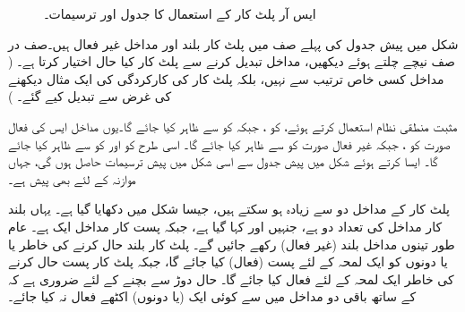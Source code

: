 \begin{figure}
\begin{subfigure}{0.45\textwidth}
\end{subfigure}
\caption{ایس آر پلٹ کار کے استعمال کا جدول اور ترسیمات۔}
\label{جدول_ترتیبی_ایس_آر_کام}
\end{figure}

شکل   میں پیش جدول     کی  پہلے صف میں پلٹ کار بلند    اور مداخل غیر فعال ہیں۔صف در صف نیچے چلتے ہوئے دیکھیں، مداخل تبدیل کرنے سے پلٹ کار کیا حال اختیار   کرتا ہے۔ ( مداخل کسی خاص ترتیب سے نہیں،   بلکہ پلٹ کار کی  کارکردگی کی   ایک مثال  دیکھنے کی  غرض سے تبدیل کیے گئے۔ )

مثبت منطقی نظام استعمال  کرتے ہوئے،        کو ، جبکہ    کو   سے ظاہر کیا جائے گا۔یوں مداخل ایس کی فعال صورت    کو ، جبکہ  غیر  فعال صورت  کو  سے ظاہر کیا جائے گا۔ اسی طرح  کو  اور  کو  سے ظاہر کیا جائے  گا۔ ایسا کرتے ہوئے   شکل  میں پیش جدول سے اسی شکل میں پیش ترسیمات حاصل ہوں گی،  جہاں موازنہ  کے لئے  بھی پیش ہے۔




پلٹ کار کے مداخل دو سے زیادہ    ہو سکتے  ہیں، جیسا شکل    میں دکھایا گیا ہے۔  یہاں بلند کار  مداخل کی تعداد دو ہے، جنہیں  اور  کہا گیا ہے،  جبکہ پست کار مداخل ایک ہے۔  عام طور  تینوں مداخل بلند  (غیر فعال) رکھے جائیں گے۔ پلٹ کار  بلند حال کرنے کی خاطر    یا    یا  دونوں کو  ایک لمحہ کے لئے  پست (فعال)  کیا جائے گا، جبکہ پلٹ کار  پست حال کرنے کی خاطر   ایک لمحہ کے لئے فعال کیا جائے گا۔ حال  دوڑ سے بچنے کے لئے ضروری ہے کہ   کے ساتھ باقی دو مداخل میں سے کوئی  ایک (یا دونوں)   اکٹھے فعال نہ کیا جائے۔


